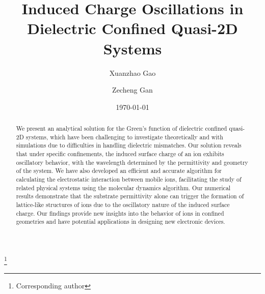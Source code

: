 \documentclass[aps,prl,reprint,showpacs,floatfix,superscriptaddress]{revtex4-2}
\begin{document}

\title{Induced Charge Oscillations in Dielectric Confined Quasi-2D Systems}

\author{Xuanzhao Gao}

\author{Zecheng Gan} \thanks{Corresponding author}

\date{\today}

\begin{abstract}
    We present an analytical solution for the Green's function of dielectric confined quasi-2D systems, which have been challenging to investigate theoretically and with simulations due to difficulties in handling dielectric mismatches. 
    Our solution reveals that under specific confinements, the induced surface charge of an ion exhibits oscillatory behavior, with the wavelength determined by the permittivity and geometry of the system. 
    We have also developed an efficient and accurate algorithm for calculating the electrostatic interaction between mobile ions, facilitating the study of related physical systems using the molecular dynamics algorithm. 
    Our numerical results demonstrate that the substrate permittivity alone can trigger the formation of lattice-like structures of ions due to the oscillatory nature of the induced surface charge. 
    Our findings provide new insights into the behavior of ions in confined geometries and have potential applications in designing new electronic devices.
\end{abstract}



\maketitle

\end{document}
